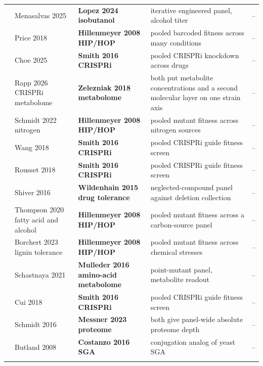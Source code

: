 \begin{landscape}
\begin{longtable}{@{}r@{\hspace{4pt}} L{40mm} L{40mm} L{74mm} L{74mm}@{}}
 & Menasalvas 2025  & \textbf{Lopez 2024 isobutanol} & iterative engineered panel, alcohol titer & -- \\
 & Price 2018  & \textbf{Hillenmeyer 2008 HIP/HOP} & pooled barcoded fitness across many conditions & -- \\
 & Choe 2025  & \textbf{Smith 2016 CRISPRi} & pooled CRISPRi knockdown across drugs & -- \\
 & Rapp 2026 CRISPRi metabolome  & \textbf{Zelezniak 2018 metabolome} & both put metabolite concentrations and a second molecular layer on one strain axis & -- \\
 & Schmidt 2022 nitrogen  & \textbf{Hillenmeyer 2008 HIP/HOP} & pooled mutant fitness across nitrogen sources & -- \\
 & Wang 2018  & \textbf{Smith 2016 CRISPRi} & pooled CRISPRi guide fitness screen & -- \\
 & Rousset 2018  & \textbf{Smith 2016 CRISPRi} & pooled CRISPRi guide fitness screen & -- \\
 & Shiver 2016  & \textbf{Wildenhain 2015 drug tolerance} & neglected-compound panel against deletion collection & -- \\
 & Thompson 2020 fatty acid and alcohol  & \textbf{Hillenmeyer 2008 HIP/HOP} & pooled mutant fitness across a carbon-source panel & -- \\
 & Borchert 2023 lignin tolerance  & \textbf{Hillenmeyer 2008 HIP/HOP} & pooled mutant fitness across chemical stresses & -- \\
 & Schastnaya 2021  & \textbf{Mulleder 2016 amino-acid metabolome} & point-mutant panel, metabolite readout & -- \\
 & Cui 2018  & \textbf{Smith 2016 CRISPRi} & pooled CRISPRi guide fitness screen & -- \\
 & Schmidt 2016  & \textbf{Messner 2023 proteome} & both give panel-wide absolute proteome depth & -- \\
 & Butland 2008  & \textbf{Costanzo 2016 SGA} & conjugation analog of yeast SGA & -- \\
\addlinespace[5pt]

\end{longtable}
\end{landscape}
